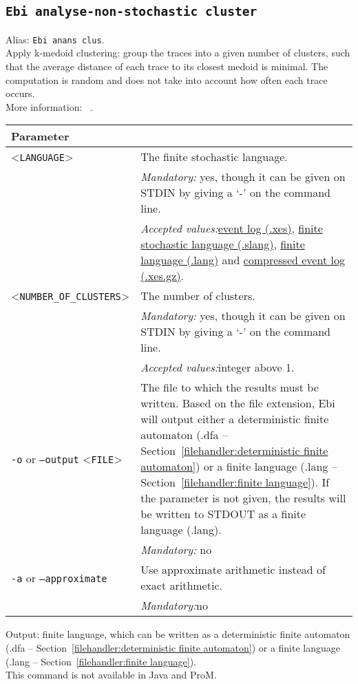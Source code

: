 {\subsection{\texttt{Ebi analyse-non-stochastic cluster}}
\label{command:Ebi analyse-non-stochastic cluster}
Alias: \texttt{Ebi anans clus}.\\
Apply k-medoid clustering: group the traces into a given number of clusters, such that the average distance of each trace to its closest medoid is minimal. The computation is random and does not take into account how often each trace occurs.\\
More information: ~\cite{DBLP:journals/is/SchubertR21}.\\
\begin{tabularx}{\linewidth}{lX}
\toprule
Parameter \\\midrule
<\texttt{LANGUAGE}>&The finite stochastic language.\\
&\textit{Mandatory:} \quad yes, though it can be given on STDIN by giving a `-' on the command line.\\
&\textit{Accepted values:}\quad \hyperref[filehandler:event log]{event log (.xes)}, \hyperref[filehandler:finite stochastic language]{finite stochastic language (.slang)}, \hyperref[filehandler:finite language]{finite language (.lang)} and \hyperref[filehandler:compressed event log]{compressed event log (.xes.gz)}.\\
<\texttt{NUMBER\_OF\_CLUSTERS}>&The number of clusters.\\
&\textit{Mandatory:} \quad yes, though it can be given on STDIN by giving a `-' on the command line.\\
&\textit{Accepted values:}\quad integer above 1.\\
\texttt{-o} or \texttt{--output} <\texttt{FILE}> &
The file to which the results must be written. Based on the file extension, Ebi will output either a deterministic finite automaton (.dfa -- Section~\ref{filehandler:deterministic finite automaton}) or a finite language (.lang -- Section~\ref{filehandler:finite language}).
If the parameter is not given, the results will be written to STDOUT as a finite language (.lang).\\
&\textit{Mandatory:} \quad no\\
\texttt{-a} or \texttt{--approximate} & Use approximate arithmetic instead of exact arithmetic.\\
&\textit{Mandatory:}\quad no\\
\bottomrule
\end{tabularx}
\noindent Output: finite language, which can be written as a deterministic finite automaton (.dfa -- Section~\ref{filehandler:deterministic finite automaton}) or a finite language (.lang -- Section~\ref{filehandler:finite language}).
\\This command is not available in Java and ProM.
}
